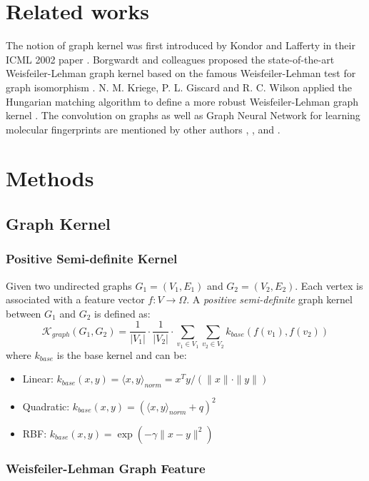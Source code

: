 \documentclass[a4paper]{article}
\begin{document}
\section{Related works}

The notion of graph kernel was first introduced by Kondor and Lafferty in their ICML 2002 paper \cite{Risi}. Borgwardt and colleagues proposed the state-of-the-art Weisfeiler-Lehman graph kernel based on the famous Weisfeiler-Lehman test for graph isomorphism \cite{Nino}. N. M. Kriege, P. L. Giscard and R. C. Wilson applied the Hungarian matching algorithm to define a more robust Weisfeiler-Lehman graph kernel \cite{Nils}. The convolution on graphs as well as Graph Neural Network for learning molecular fingerprints are mentioned by other authors \cite{Steven}, \cite{Duvenaud}, and \cite{Thomas}.

\section{Methods}

\subsection{Graph Kernel}

\subsubsection{Positive Semi-definite Kernel}

Given two undirected graphs $G_1 = (V_1, E_1)$ and $G_2 = (V_2, E_2)$. Each vertex is associated with a feature vector $f: V \rightarrow \Omega$. A \textit{positive semi-definite} graph kernel between $G_1$ and $G_2$ is defined as:
$$\mathcal{K}_{graph}(G_1, G_2) = \frac{1}{|V_1|} \cdot \frac{1}{|V_2|} \cdot \sum\limits_{v_1 \in V_1} \sum\limits_{v_2 \in V_2} k_{base}(f(v_1), f(v_2))$$
where $k_{base}$ is the base kernel and can be:
\begin{itemize}
	\item Linear: $k_{base}(x, y) = \langle x, y \rangle_{norm} = x^Ty / (\|x\| \cdot \|y\|)$
	\item Quadratic: $k_{base}(x, y) = (\langle x, y \rangle_{norm} + q)^2$
	\item RBF: $k_{base}(x, y) = \exp(-\gamma \|x - y\|^2)$
\end{itemize}

\subsubsection{Weisfeiler-Lehman Graph Feature}
\end{document}
